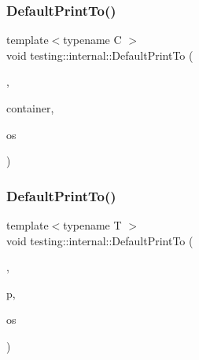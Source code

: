 \mbox{\label{namespacetesting_1_1internal_a2e96c98d5bd8ee4a1b92f8e3cde7dd40}} 
\subsubsection{\texorpdfstring{Default\+Print\+To()}{DefaultPrintTo()}\hspace{0.1cm}{\footnotesize\ttfamily [1/4]}}
{\footnotesize\ttfamily template$<$typename C $>$ \\
void testing\+::internal\+::\+Default\+Print\+To (\begin{DoxyParamCaption}\item[{\hyperlink{structtesting_1_1internal_1_1WrapPrinterType}{Wrap\+Printer\+Type}$<$ \hyperlink{namespacetesting_1_1internal_a17fb8f0125fa92404a249ed38a43faa4a945a19e59155ce1d335e8c3bcbdf61db}{k\+Print\+Container} $>$}]{,  }\item[{const C \&}]{container,  }\item[{\+::std\+::ostream $\ast$}]{os }\end{DoxyParamCaption})}

\mbox{\label{namespacetesting_1_1internal_a074522dd8d77d61878a042b8d05cc64a}} 
\subsubsection{\texorpdfstring{Default\+Print\+To()}{DefaultPrintTo()}\hspace{0.1cm}{\footnotesize\ttfamily [2/4]}}
{\footnotesize\ttfamily template$<$typename T $>$ \\
void testing\+::internal\+::\+Default\+Print\+To (\begin{DoxyParamCaption}\item[{\hyperlink{structtesting_1_1internal_1_1WrapPrinterType}{Wrap\+Printer\+Type}$<$ \hyperlink{namespacetesting_1_1internal_a17fb8f0125fa92404a249ed38a43faa4a8eaa6fff4a58832b30027df49f73dcbf}{k\+Print\+Pointer} $>$}]{,  }\item[{T $\ast$}]{p,  }\item[{\+::std\+::ostream $\ast$}]{os }\end{DoxyParamCaption})}


